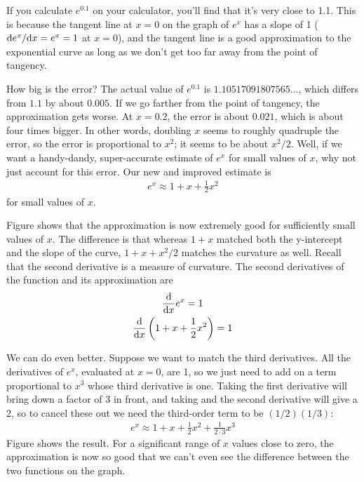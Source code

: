 If you calculate $e^{0.1}$ on your calculator, you'll find that
it's very close to 1.1. This is because the tangent line at $x=0$
on the graph of $e^x$ has a slope of 1 ($\textup{d} e^x/\textup{d} x=e^x=1$ at $x=0$),
and the tangent line is a good approximation to the exponential curve
as long as we don't get too far away from the point of tangency.


How big is the error? The actual value of $e^{0.1}$ is $1.10517091807565\ldots$, which
differs from $1.1$ by about $0.005$. If we go farther from the point of tangency,
the approximation gets worse. At $x=0.2$, the error is about $0.021$, which is about
four times bigger. In other words, doubling $x$ seems to roughly quadruple the error,
so the error is proportional to $x^2$; it seems to be about $x^2/2$. Well, if we want a handy-dandy, super-accurate
estimate of $e^x$ for small values of $x$, why not just account for this
error. Our new and improved estimate is
\begin{align*}
  e^x \approx 1+x+\frac{1}{2}x^2
\end{align*}
for small values of $x$.


Figure  shows that the approximation is now extremely good for sufficiently small values of $x$.
The difference is that whereas $1+x$ matched both the y-intercept and the slope of the curve, $1+x+x^2/2$ matches
the curvature as well. Recall that the second derivative is a measure of curvature. The second derivatives of the
function and its approximation are
\begin{gather*}
  \frac{\textup{d}}{\textup{d} x} e^x = 1\\
  \frac{\textup{d}}{\textup{d} x} \left(1+x+\frac{1}{2}x^2\right) = 1
\end{gather*}

%
We can do even better. Suppose we want to match the third derivatives. All the derivatives of $e^x$, evaluated
at $x=0$, are 1, so we just need to add on a term proportional to $x^3$ whose third derivative is one. Taking the
first derivative will bring down a factor of 3 in front, and taking and the second derivative will give a 2, so
to cancel these out we need the third-order term to be $(1/2)(1/3)$:
\begin{align*}
  e^x \approx 1+x+\frac{1}{2}x^2+\frac{1}{2\cdot3}x^3
\end{align*}
Figure  shows the result. For a significant range of $x$ values close to zero, the approximation is
now so good that we can't even see the difference between the two functions on the graph.

